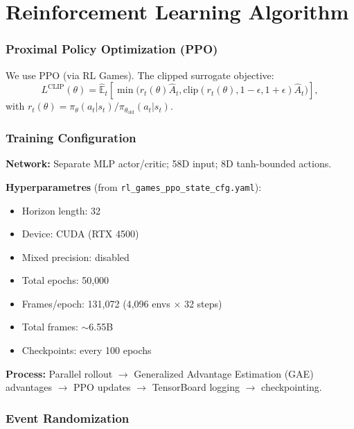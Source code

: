\documentclass[12pt,a4paper,oneside]{report}
\begin{document}
\section{Reinforcement Learning Algorithm}

\subsubsection{Proximal Policy Optimization (PPO)}
We use PPO (via RL Games). The clipped surrogate objective:
\[
L^{\mathrm{CLIP}}(\theta) = \hat{\mathbb{E}}_t \left[ \min\big(r_t(\theta)\hat{A}_t, \mathrm{clip}(r_t(\theta), 1-\epsilon, 1+\epsilon)\hat{A}_t \big) \right],
\]
with $r_t(\theta)=\pi_\theta(a_t|s_t)/\pi_{\theta_\mathrm{old}}(a_t|s_t)$.

\subsubsection{Training Configuration}
\textbf{Network:} Separate MLP actor/critic; 58D input; 8D tanh-bounded actions.

\textbf{Hyperparametres} (from \texttt{rl\_games\_ppo\_state\_cfg.yaml}):
\begin{itemize}
    \item Horizon length: 32
    \item Device: CUDA (RTX 4500)
    \item Mixed precision: disabled
    \item Total epochs: 50{,}000
    \item Frames/epoch: 131{,}072 (4{,}096 envs $\times$ 32 steps)
    \item Total frames: $\sim$6.55B
    \item Checkpoints: every 100 epochs
\end{itemize}

\textbf{Process:} Parallel rollout $\rightarrow$ Generalized Advantage Estimation (GAE) advantages $\rightarrow$ PPO updates $\rightarrow$ TensorBoard logging $\rightarrow$ checkpointing.

\subsubsection{Event Randomization}
\end{document}
